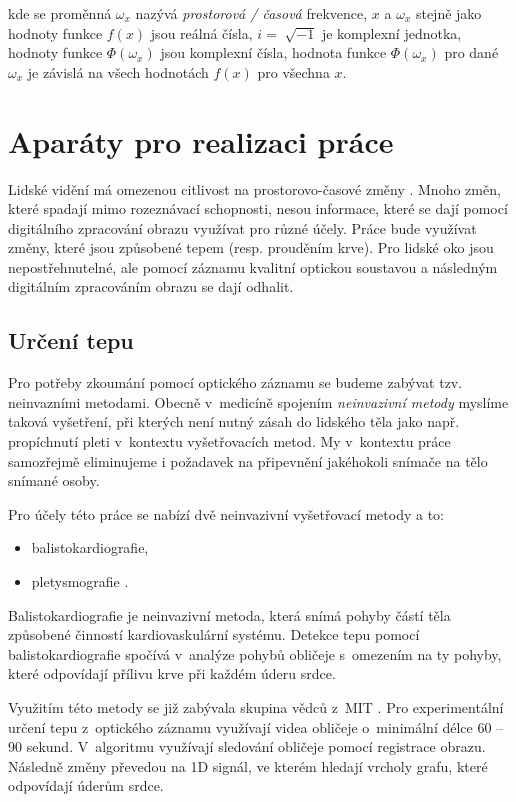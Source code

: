 \documentclass[
  digital, %
  table,   %
%
  lof,     %
  lot,     %
]{fithesis3}
\begin{document}
kde se proměnná $\omega_x$ nazývá \emph{prostorová / časová} frekvence, $x$ a $\omega_x$ stejně jako hodnoty funkce $f(x)$ jsou reálná čísla, $i = \sqrt[]{-1}$ je komplexní jednotka, hodnoty funkce $\Phi(\omega_x)$ jsou komplexní čísla, hodnota funkce $\Phi(\omega_x)$ pro dané $\omega_x$ je závislá na všech hodnotách $f(x)$ pro všechna $x$.

\chapter{Aparáty pro realizaci práce}
Lidské vidění má omezenou citlivost na prostorovo-časové změny \cite{eulerian-magnification}.
Mnoho změn, které spadají mimo rozeznávací schopnosti, nesou informace, které se dají pomocí digitálního zpracování obrazu využívat pro různé účely. Práce bude využívat změny, které jsou způsobené tepem (resp. prouděním krve). Pro lidské oko jsou nepostřehnutelné, ale pomocí záznamu kvalitní optickou soustavou a následným digitálním zpracováním obrazu se dají odhalit.

\section{Určení tepu}
\label{sec:bpm-detect}
Pro potřeby zkoumání pomocí optického záznamu se budeme zabývat tzv. neinvazními metodami. Obecně v~medicíně spojením \emph{neinvazivní metody} myslíme taková vyšetření, při kterých není nutný zásah do lidského těla jako např. propíchnutí pleti v~kontextu vyšetřovacích metod. My v~kontextu práce samozřejmě eliminujeme i požadavek na připevnění jakéhokoli snímače na tělo snímané osoby. 

Pro účely této práce se nabízí dvě neinvazivní vyšetřovací metody a to:
\begin{itemize}
  \item balistokardiografie,
      \cite{balistography-source}
    \item pletysmografie 
      \cite{remote-plethysmographic}.
\end{itemize}

Balistokardiografie je neinvazivní metoda, která snímá pohyby částí těla způsobené činností kardiovaskulární systému. Detekce tepu pomocí balistokardiografie spočívá v~analýze pohybů obličeje s~omezením na ty pohyby, které odpovídají přílivu krve při každém úderu srdce.

Využitím této metody se již zabývala skupina vědců z~MIT \cite{headmotion-detection}. Pro experimentální určení tepu z~optického záznamu využívají videa obličeje o~minimální délce 60 -- 90 sekund. V~algoritmu využívají sledování obličeje pomocí registrace obrazu. Následně změny převedou na 1D signál, ve kterém hledají vrcholy grafu, které odpovídají úderům srdce.
\end{document}

